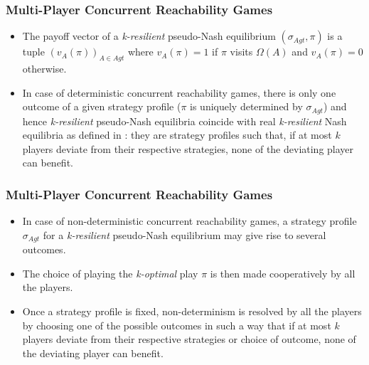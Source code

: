 \documentclass{beamer}
\begin{document}
\begin{frame}
\frametitle{Multi-Player Concurrent Reachability Games}
\begin{itemize}
\item The payoff vector of a \textit{k-resilient} pseudo-Nash equilibrium $(\sigma_{Agt}, \pi)$ is a tuple $(v_{A}(\pi))_{A \in Agt}$ where $v_{A}(\pi) = 1$ if $\pi$ visits $\Omega (A)$ and $v_{A}(\pi) = 0$ otherwise.
\item In case of deterministic concurrent reachability games, there is only one outcome of a given strategy profile ($\pi$ is uniquely determined by $\sigma_{Agt}$) and hence \textit{k-resilient} pseudo-Nash equilibria coincide with real \textit{k-resilient} Nash equilibria as defined in \cite{Abraham-2006,Abraham-2008}: they are strategy profiles such that, if at most $k$ players deviate from their respective strategies, none of the deviating player can benefit.
\end{itemize}
\end{frame}

\begin{frame}
\frametitle{Multi-Player Concurrent Reachability Games}
\begin{itemize}
\item In case of non-deterministic concurrent reachability games, a strategy profile $\sigma_{Agt}$ for a \textit{k-resilient} pseudo-Nash equilibrium may give rise to several outcomes.
\item The choice of playing the \textit{k-optimal} play $\pi$ is then made cooperatively by all the players.
\item Once a strategy profile is fixed, non-determinism is resolved by all the players by choosing one of the possible outcomes in such a way that if at most $k$ players deviate from their respective strategies or choice of outcome, none of the deviating player can benefit.
\end{itemize}
\end{frame}
\end{document}
